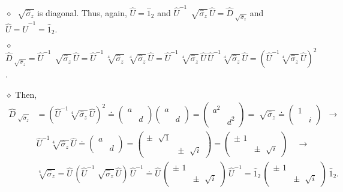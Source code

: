 \documentclass[11pt]{article}
\numberwithin{equation}{section} %
\numberwithin{figure}{section} %
\begin{document}
\begin{appendices}
$\diamond$ $\sqrt[]{\hat{\sigma}_z}$ is diagonal. Thus, again, $\hat{U}=\hat{1}_2$ and 
$\hat{U}^{-1}\,\sqrt[]{\hat{\sigma}_z}\,\hat{U}=\hat{D}_{\sqrt[]{\hat{\sigma}_z}}$ and  $\hat{U}=\hat{U}^{-1}=\hat{1}_2$.

$\diamond$ $\hat{D}_{\sqrt[]{\hat{\sigma}_z}}=\hat{U}^{-1}\,\sqrt[]{\hat{\sigma}_z}\,\hat{U}= \hat{U}^{-1}\,\sqrt[4]{\hat{\sigma}_z}\,\,\sqrt[4]{\hat{\sigma}_z}\,\hat{U} = \hat{U}^{-1}\,\sqrt[4]{\hat{\sigma}_z}\,\hat{U}\,\hat{U}^{-1}\sqrt[4]{\hat{\sigma}_z}\,\hat{U} = (\hat{U}^{-1}\sqrt[4]{\hat{\sigma}_z}\,\hat{U})^2$.

$\diamond$ Then, 
\begin{equation} \label{sigma_z_square_root_4}
\begin{split}
\hat{D}_{\sqrt[]{\hat{\sigma}_z}} 
&	= (\hat{U}^{-1}\sqrt[4]{\hat{\sigma}_z}\,\hat{U})^2 \doteq \begin{pmatrix}a&\\&d\end{pmatrix} \begin{pmatrix}a&\\&d\end{pmatrix} = \begin{pmatrix}a^2&\\&d^2\end{pmatrix} = \sqrt[]{\hat{\sigma}_z} \doteq \begin{pmatrix}1&\\&i\end{pmatrix} \,\,\, \rightarrow \\
&	\hat{U}^{-1}\sqrt[4]{\hat{\sigma}_z}\,\hat{U} \doteq \begin{pmatrix}a&\\&d\end{pmatrix} = \begin{pmatrix}\pm\,\,\sqrt[]{1}&\\&\pm\,\,\sqrt[]{i}\end{pmatrix} = \begin{pmatrix}\pm\,\,1&\\&\pm\,\,\sqrt[]{i}\end{pmatrix}\,\,\,\,\,\,\rightarrow \\
&	\sqrt[4]{\hat{\sigma}_z} = \hat{U}\,(\hat{U}^{-1}\sqrt[]{\hat{\sigma}_z}\,\hat{U})\,\hat{U}^{-1} \doteq \hat{U}\, \begin{pmatrix}\pm\,\,1&\\&\pm\,\,\sqrt[]{i}\end{pmatrix} \,\hat{U}^{-1} = \hat{1}_2\,\begin{pmatrix}\pm\,\,1&\\&\pm\,\,\sqrt[]{i}\end{pmatrix} \,\hat{1}_2.

\end{split}
\end{equation}
\end{appendices}
\end{document}
